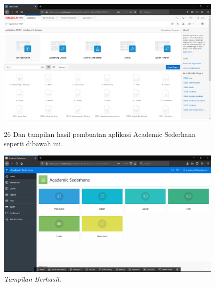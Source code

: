 \begin{enumerate}
\begin{figure}
    \begin{center}
\includegraphics[scale=0.2]{figures/39.png}
    \caption{\textit{}}
        \end{center}
\label{gambar}
\end{figure}


\begin{figure}
\item[26]Dan tampilan hasil pembuatan aplikasi Academic Sederhana seperti dibawah ini.

    \begin{center}
\includegraphics[scale=0.2]{figures/40.png}
    \caption{\textit{Tampilan Berhasil.}}
        \end{center}
\label{gambar}
\end{figure}



\end{enumerate}
